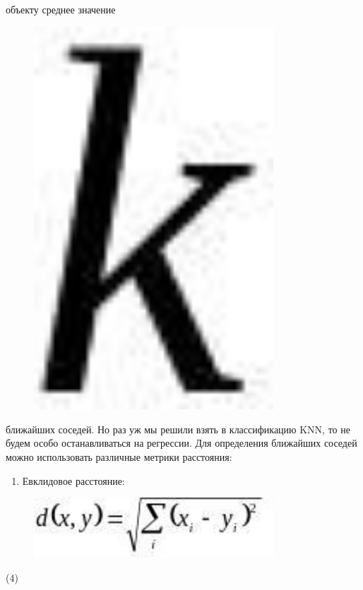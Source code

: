 объекту среднее значение \begin{figure}[H]
	\centering
	\includegraphics[width=0.8\textwidth]{assets/92}
	\caption*{}
\end{figure} ближайших
соседей. Но раз уж мы решили взять в классификацию KNN, то не будем
особо останавливаться на регрессии. Для определения ближайших соседей
можно использовать различные метрики расстояния:

\begin{enumerate}
\def\labelenumi{\arabic{enumi}.}
\item
  Евклидовое расстояние:
\end{enumerate}

\begin{figure}[H]
	\centering
	\includegraphics[width=0.8\textwidth]{assets/95}
	\caption*{}
\end{figure} (4)


